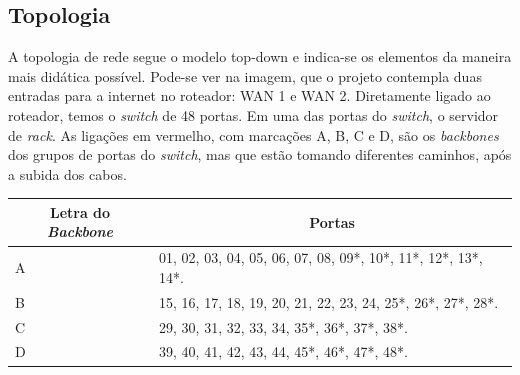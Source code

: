 \documentclass[	DIV=calc,%
							paper=a4,%
							fontsize=12pt,%
							onecolumn]{scrartcl}	 					%
\begin{document}
\clearpage
{}
\recalctypearea











\subsection{Topologia}

A topologia de rede segue o modelo top-down e indica-se os elementos da maneira mais didática possível. Pode-se ver na imagem, que o projeto contempla duas entradas para a internet no roteador: WAN 1 e WAN 2. Diretamente ligado ao roteador, temos o \textit{switch} de 48 portas. Em uma das portas do \textit{switch}, o servidor de \textit{rack}. As ligações em vermelho, com marcações A, B, C e D, são os \textit{backbones} dos grupos de portas do \textit{switch}, mas que estão tomando diferentes caminhos, após a subida dos cabos.


\begin{table}[H]
	\centering
	\renewcommand{\arraystretch}{2.0}
	\begin{tabular}{|l|l|}
		\hline
		\multicolumn{1}{|c|}{\textbf{Letra do \textit{Backbone}}} &	 \multicolumn{1}{|c|}{\textbf{Portas}}                                 		  \\ \hline		A                                
		& 01, 02, 03, 04, 05, 06, 07, 08, 09*, 10*, 11*, 12*, 13*, 14*.                                             \\ \hline
		B                               
		& 15, 16, 17, 18, 19, 20, 21, 22, 23, 24, 25*, 26*, 27*, 28*.         					\\ \hline
		C                                  
		& 29, 30, 31, 32, 33, 34, 35*, 36*, 37*, 38*.          \\ \hline
		D 
		& 39, 40, 41, 42, 43, 44, 45*, 46*, 47*, 48*.         \\ \hline
		
	\end{tabular}
\end{table}

\end{document}
